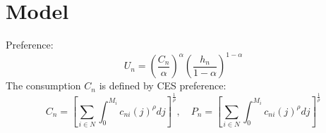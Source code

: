 \documentclass[11pt,a4paper]{article}
\begin{document}
\section{Model}
Preference: 
\begin{equation}
    U_n = \left( \frac{C_n}{\alpha } \right)^{\alpha } \left( \frac{h_n}{1-\alpha } \right)^{1-\alpha }
\end{equation}
The consumption $C_n$ is defined by CES preference:
\begin{equation}
    C_n = \left[ \sum_{i \in N} \int_{0}^{M_i} c_{ni}(j)^\rho d j\right]^{\frac{1}{\rho}},\quad P_n = \left[ \sum_{i \in N} \int_{0}^{M_i} c_{ni}(j)^\rho d j\right]^{\frac{1}{\rho}}
\end{equation}
\end{document}
